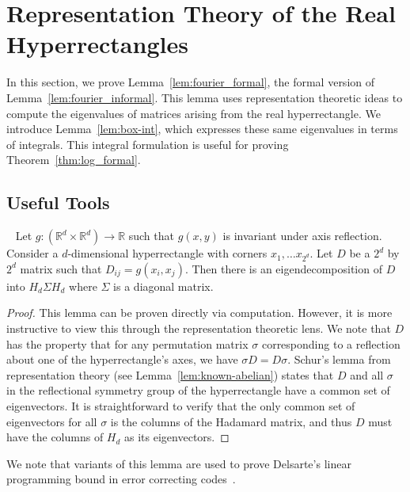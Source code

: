 \section{Representation Theory of the Real Hyperrectangles}\label{sec:key}
In this section, we prove Lemma~\ref{lem:fourier_formal}, the formal version of Lemma~\ref{lem:fourier_informal}. This lemma uses representation theoretic ideas to compute the eigenvalues of matrices arising from the real hyperrectangle. We introduce Lemma~\ref{lem:box-int}, which expresses these same eigenvalues in terms of integrals. This integral formulation is useful for proving Theorem~\ref{thm:log_formal}.

\subsection{Useful Tools}

\begin{lemma}~\label{lem:key} Let $g:(\mathbb{R}^d \times \mathbb{R}^d)
  \rightarrow \mathbb{R}$ such that $g(x,y)$ is invariant under axis
  reflection.  Consider a $d$-dimensional hyperrectangle with
corners $x_1, \ldots x_{2^d}$.  
  Let $D$ be a $2^d$ by $2^d$ matrix such that $D_{ij} = g(x_i, x_j)$.
  Then there is an eigendecomposition of $D$ into $H_d \Sigma H_d$ where $\Sigma$ is a
diagonal matrix.
\end{lemma}
\begin{proof} This lemma can be proven directly via computation.
However, it is more instructive to view this through the representation
theoretic lens. We note that $D$ has the property that for any
permutation matrix $\sigma$ corresponding to a reflection about one of
the hyperrectangle's axes, we have $\sigma D = D\sigma$. Schur's lemma from
representation theory (see Lemma~\ref{lem:known-abelian}) states that $D$
  and all $\sigma$ in the reflectional symmetry group of the hyperrectangle have a common set of eigenvectors. It is straightforward
to verify that the only common set of eigenvectors for all $\sigma$ is
the columns of the Hadamard matrix, and thus $D$ must have the columns
of $H_d$ as its eigenvectors.
\end{proof}
We note that variants of this lemma are used to prove Delsarte's linear programming
bound in error correcting codes~\cite{delsarte, ODonnell14}.
